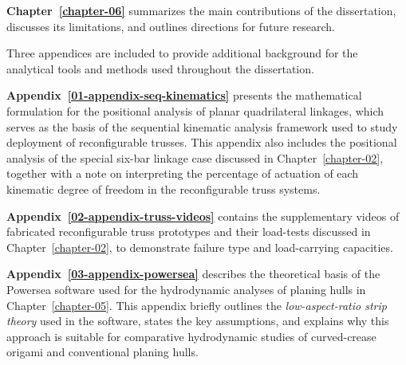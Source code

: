 \textbf{Chapter~\ref{chapter-06}} summarizes the main contributions of the dissertation, discusses its limitations, and outlines directions for future research.

Three appendices are included to provide additional background for the analytical tools and methods used throughout the dissertation.

\textbf{Appendix~\ref{01-appendix-seq-kinematics}} presents the mathematical formulation for the positional analysis of planar quadrilateral linkages, which serves as the basis of the sequential kinematic analysis framework used to study deployment of reconfigurable trusses. This appendix also includes the positional analysis of the special six-bar linkage case discussed in Chapter~\ref{chapter-02}, together with a note on interpreting the percentage of actuation of each kinematic degree of freedom in the reconfigurable truss systems.

\textbf{Appendix~\ref{02-appendix-truss-videos}} contains the supplementary videos of fabricated reconfigurable truss prototypes and their load-tests discussed in Chapter~\ref{chapter-02}, to demonstrate failure type and load-carrying capacities.

\textbf{Appendix~\ref{03-appendix-powersea}} describes the theoretical basis of the Powersea software used for the hydrodynamic analyses of planing hulls in Chapter~\ref{chapter-05}. This appendix briefly outlines the \textit{low-aspect-ratio strip theory} used in the software, states the key assumptions, and explains why this approach is suitable for comparative hydrodynamic studies of curved-crease origami and conventional planing hulls.